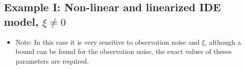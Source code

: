 \documentclass[10pt,twocolumn,twoside]{IEEEtran}
\begin{document}
\subsection{Example I: Non-linear and linearized IDE model, $\xi\neq 0$}
\begin{itemize}
\item Note: In this case it is very sensitive to observation noise and $\xi$, although a bound can be found for the observation noise, the exact values of theses parameters are required.
\end{itemize}
\end{document}
